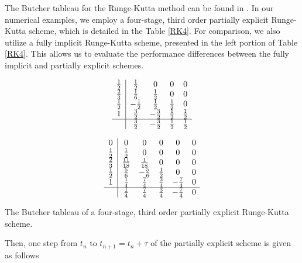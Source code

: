 \documentclass[preprint,12pt]{elsarticle}
\begin{document}
The Butcher tableau for the Runge-Kutta method can be found in \cite{ascher1997implicit}. In our numerical examples, we employ a four-stage, third order partially explicit Runge-Kutta scheme, which is detailed in the Table \ref{RK4}. For comparison, we also utilize a fully implicit Runge-Kutta scheme, presented in the left portion of Table \ref{RK4}. This allows us to evaluate the performance differences between the fully implicit and partially explicit schemes.
\begin{table}[H]
    \begin{minipage}{0.49\textwidth}
        \bgroup
        \renewcommand{\arraystretch}{1.5}
        $$
        \begin{array}{c|cccc}
        \frac{1}{2} & \frac{1}{2} & 0 & 0 & 0 \\
        \frac{2}{3} & \frac{1}{6} & \frac{1}{2} & 0 & 0 \\
        \frac{1}{2} & -\frac{1}{2} & \frac{1}{2} & \frac{1}{2} & 0 \\
        1 & \frac{3}{2} & -\frac{3}{2} & \frac{1}{2} & \frac{1}{2} \\
        \hline
         & \frac{3}{2} & -\frac{3}{2} & \frac{1}{2} & \frac{1}{2}
        \end{array}
        $$
        \egroup
    \end{minipage}
    \begin{minipage}{0.49\textwidth}
        \bgroup
        \renewcommand{\arraystretch}{1.5} 
        $$
        \begin{array}{c|ccccc}
        0 & 0 & 0 & 0 & 0 & 0 \\
        \frac{1}{2} & \frac{1}{2} & 0 & 0 & 0 & 0 \\
        \frac{2}{3} & \frac{11}{18} & \frac{1}{18} & 0 & 0 & 0 \\
        \frac{1}{2} & \frac{5}{6} & -\frac{5}{6} & \frac{1}{2} & 0 & 0 \\
        1 & \frac{1}{4} & \frac{7}{4} & \frac{3}{4} & -\frac{7}{4} & 0 \\
        \hline
         & \frac{1}{4} & \frac{7}{4} & \frac{3}{4} & -\frac{7}{4} & 0
        \end{array}
        $$
        \egroup
    \end{minipage}
    \caption{The Butcher tableau of a four-stage, third order partially explicit Runge-Kutta scheme.}
    \label{RK4}
\end{table}

Then, one step from $t_{n}$ to $t_{n+1}=t_n+\tau$ of the partially explicit scheme is given as follows
\end{document}
